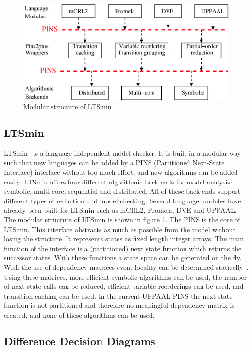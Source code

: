\begin{figure}[t] 
\includegraphics[width=\textwidth]{pins_modern}
\caption{Modular structure of LTSmin}
\label{fig:pins_modern}
\end{figure}

\subsection{LTSmin}
LTSmin~\cite{eemcs18152,ltsmin-mc:nmf2011} is a language independent model checker. It is built in a modular way such that new languages can be added by a PINS (Partitioned Next-State Interface) interface without too much effort, and new algorithms can be added easily. LTSmin offers four different algorithmic back ends for model analysis: symbolic, multi-core, sequential and distributed. All of these back ends support different types of reduction and model checking. Several language modules have already been built for LTSmin such as mCRL2, Promela, DVE and UPPAAL. The modular structure of LTSmin is shown in figure \ref{fig:pins_modern}. The PINS is the core of LTSmin. This interface abstracts as much as possible from the model without losing the structure. It represents states as fixed length integer arrays. The main function of the interface is a (partitioned) next state function which returns the successor states. With these functions a state space can be generated on the fly. With the use of dependency matrices event locality can be determined statically~\cite{rwcmatrices}. Using these matrices, more efficient symbolic algorithms can be used, the number of next-state calls can be reduced, efficient variable reorderings can be used, and transition caching can be used. In the current UPPAAL PINS the next-state function is not partitioned and therefore no meaningful dependency matrix is created, and none of these algorithms can be used.

\subsection{Difference Decision Diagrams}

